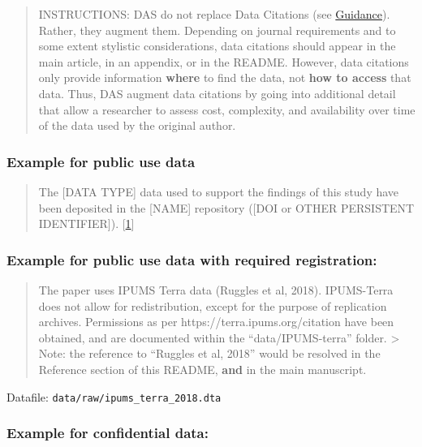 \documentclass[
]{article}
\begin{document}
\begin{quote}
INSTRUCTIONS: DAS do not replace Data Citations (see
\href{https://social-science-data-editors.github.io/guidance/Data_citation_guidance.html}{Guidance}).
Rather, they augment them. Depending on journal requirements and to some
extent stylistic considerations, data citations should appear in the
main article, in an appendix, or in the README. However, data citations
only provide information \textbf{where} to find the data, not
\textbf{how to access} that data. Thus, DAS augment data citations by
going into additional detail that allow a researcher to assess cost,
complexity, and availability over time of the data used by the original
author.
\end{quote}

\hypertarget{example-for-public-use-data}{%
\subsubsection{Example for public use
data}\label{example-for-public-use-data}}

\begin{quote}
The {[}DATA TYPE{]} data used to support the findings of this study have
been deposited in the {[}NAME{]} repository ({[}DOI or OTHER PERSISTENT
IDENTIFIER{]}).
{[}\href{https://www.hindawi.com/research.data/\#statement.templates}{1}{]}
\end{quote}

\hypertarget{example-for-public-use-data-with-required-registration}{%
\subsubsection{Example for public use data with required
registration:}\label{example-for-public-use-data-with-required-registration}}

\begin{quote}
The paper uses IPUMS Terra data (Ruggles et al, 2018). IPUMS-Terra does
not allow for redistribution, except for the purpose of replication
archives. Permissions as per https://terra.ipums.org/citation have been
obtained, and are documented within the ``data/IPUMS-terra'' folder.
\textgreater{} Note: the reference to ``Ruggles et al, 2018'' would be
resolved in the Reference section of this README, \textbf{and} in the
main manuscript.
\end{quote}

Datafile: \texttt{data/raw/ipums\_terra\_2018.dta}

\hypertarget{example-for-confidential-data}{%
\subsubsection{Example for confidential
data:}\label{example-for-confidential-data}}
\end{document}
